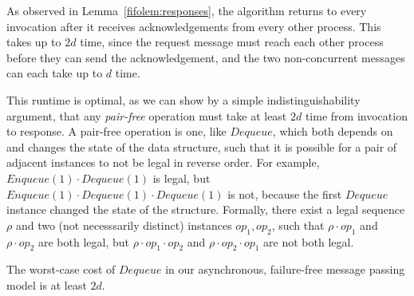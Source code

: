 \documentclass[a4paper,anonymous,USenglish]{lipics-v2021} %
\theoremstyle{definition}
\begin{document}
As observed in Lemma~\ref{fifolem:responses}, the algorithm returns to every invocation after it receives acknowledgements from every other process.  This takes up to $2d$ time, since the request message must reach each other process before they can send the acknowledgement, and the two non-concurrent messages can each take up to $d$ time.

This runtime is optimal, as we can show by a simple indistinguishability argument, that any \emph{pair-free} operation must take at least $2d$ time from invocation to response.  A pair-free operation \cite{WangTalmageLeeWelch18} is one, like $Dequeue$, which both depends on and changes the state of the data structure, such that it is possible for a pair of adjacent instances to not be legal in reverse order.  For example, $Enqueue(1) \cdot Dequeue(1)$ is legal, but $Enqueue(1) \cdot Dequeue(1) \cdot Dequeue(1)$ is not, because the first $Dequeue$ instance changed the state of the structure.  Formally, there exist a legal sequence $\rho$ and two (not necesssarily distinct) instances $op_1, op_2$, such that $\rho \cdot op_1$ and $\rho \cdot op_2$ are both legal, but $\rho \cdot op_1 \cdot op_2$ and $\rho \cdot op_2 \cdot op_1$ are not both legal.

\begin{lemma}\label{fifolem:pairfreeLB}
  The worst-case cost of $Dequeue$ in our asynchronous, failure-free message passing model is at least $2d$.
\end{lemma}
\end{document}
